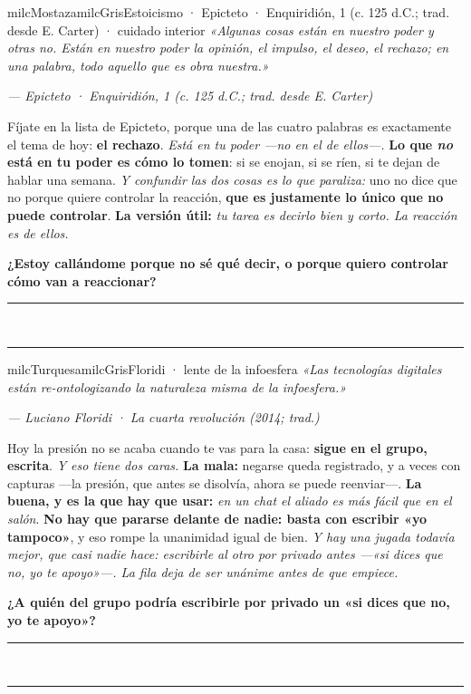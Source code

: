 \documentclass[11pt,letterpaper]{article}
\newcommand{\linead}[1]{\noindent\color{milcLinea}\rule{#1}{0.5pt}\color{milcNegro}}
\begin{document}
\begin{softbox}{milcMostaza}{milcGris}{Estoicismo · Epicteto · Enquiridión, 1 (c. 125 d.C.; trad. desde E. Carter) · cuidado interior}
\textit{«Algunas cosas están en nuestro poder y otras no. Están en nuestro poder la opinión, el impulso, el deseo, el rechazo; en una palabra, todo aquello que es obra nuestra.»}

{\footnotesize\itshape\color{milcNegro!70}--- Epicteto · Enquiridión, 1 (c. 125 d.C.; trad. desde E. Carter)}

Fíjate en la lista de Epicteto, porque una de las cuatro palabras es exactamente el tema de hoy: \textbf{el rechazo}. \emph{Está en tu poder ---no en el de ellos---.} \textbf{Lo que \emph{no} está en tu poder es cómo lo tomen}: si se enojan, si se ríen, si te dejan de hablar una semana. \emph{Y confundir las dos cosas es lo que paraliza:} uno no dice que no porque quiere controlar la reacción, \textbf{que es justamente lo único que no puede controlar}. \textbf{La versión útil:} \emph{tu tarea es decirlo bien y corto. La reacción es de ellos.}

\textbf{¿Estoy callándome porque no sé qué decir, o porque quiero controlar cómo van a reaccionar?}
\end{softbox}
\linead{\linewidth}\\[1mm]
\linead{\linewidth}

\begin{softbox}{milcTurquesa}{milcGris}{Floridi · lente de la infoesfera}
\textit{«Las tecnologías digitales están re-ontologizando la naturaleza misma de la infoesfera.»}

{\footnotesize\itshape\color{milcNegro!70}--- Luciano Floridi · La cuarta revolución (2014; trad.)}

Hoy la presión no se acaba cuando te vas para la casa: \textbf{sigue en el grupo, escrita}. \emph{Y eso tiene dos caras.} \textbf{La mala:} negarse queda registrado, y a veces con capturas ---la presión, que antes se disolvía, ahora se puede reenviar---. \textbf{La buena, y es la que hay que usar:} \emph{en un chat el aliado es más fácil que en el salón}. \textbf{No hay que pararse delante de nadie: basta con escribir «yo tampoco»}, y eso rompe la unanimidad igual de bien. \emph{Y hay una jugada todavía mejor, que casi nadie hace: escribirle al otro por privado antes ---«si dices que no, yo te apoyo»---. La fila deja de ser unánime antes de que empiece.}

\textbf{¿A quién del grupo podría escribirle por privado un «si dices que no, yo te apoyo»?}
\end{softbox}
\linead{\linewidth}\\[1mm]
\linead{\linewidth}
\end{document}
